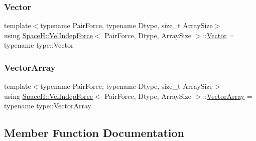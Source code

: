 \mbox{\label{struct_space_h_1_1_vel_indep_force_abc12ce8c91664111b8d37b9d439c7b89}} 
\subsubsection{\texorpdfstring{Vector}{Vector}}
{\footnotesize\ttfamily template$<$typename Pair\+Force, typename Dtype, size\+\_\+t Array\+Size$>$ \\
using \mbox{\hyperlink{struct_space_h_1_1_vel_indep_force}{Space\+H\+::\+Vel\+Indep\+Force}}$<$ Pair\+Force, Dtype, Array\+Size $>$\+::\mbox{\hyperlink{struct_space_h_1_1_vel_indep_force_abc12ce8c91664111b8d37b9d439c7b89}{Vector}} =  typename type\+::\+Vector}

\mbox{\label{struct_space_h_1_1_vel_indep_force_a6b4e8ca988b015e7f956f015991ecd80}} 
\subsubsection{\texorpdfstring{Vector\+Array}{VectorArray}}
{\footnotesize\ttfamily template$<$typename Pair\+Force, typename Dtype, size\+\_\+t Array\+Size$>$ \\
using \mbox{\hyperlink{struct_space_h_1_1_vel_indep_force}{Space\+H\+::\+Vel\+Indep\+Force}}$<$ Pair\+Force, Dtype, Array\+Size $>$\+::\mbox{\hyperlink{struct_space_h_1_1_vel_indep_force_a6b4e8ca988b015e7f956f015991ecd80}{Vector\+Array}} =  typename type\+::\+Vector\+Array}



\subsection{Member Function Documentation}
\mbox{\label{struct_space_h_1_1_vel_indep_force_a38036f5de71884159cbb513883379ae9}} 
